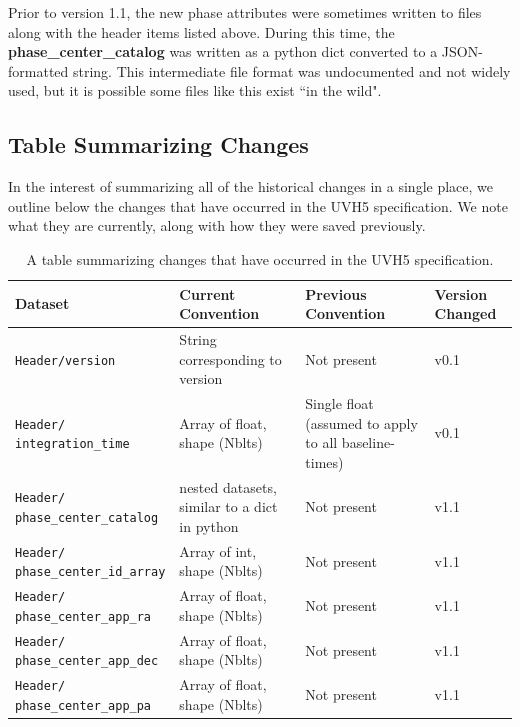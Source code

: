 \documentclass[11pt, oneside]{article}
\begin{document}
Prior to version 1.1, the new phase attributes were sometimes written to files along with the
header items listed above. During this time, the \textbf{phase\_center\_catalog} was written
as a python dict converted to a JSON-formatted string. This intermediate file format was
undocumented and not widely used, but it is possible some files like this exist ``in the wild".

\subsection{Table Summarizing Changes}
\label{sec:version_table}
In the interest of summarizing all of the historical changes in a single place,
we outline below the changes that have occurred in the UVH5 specification. We
note what they are currently, along with how they were saved
previously.

\begin{table}[t]
\begin{center}
  \begin{tabular}{ m{10em} | m{10em} | m{10em} | m{4em} }
    \textbf{Dataset} & \makecell[cl]{\textbf{Current}\\\textbf{Convention}} & \makecell[cl]{\textbf{Previous}\\\textbf{Convention}} & \textbf{Version Changed} \\\hline\hline
    \texttt{Header/version} & String corresponding to version & Not present & v0.1 \\[1em] \hline
    \makecell[tl]{\texttt{Header/}\\\texttt{integration\_time}} & Array of float, shape (Nblts) & Single float (assumed to apply to all baseline-times) & v0.1 \\[1.75em] \hline
    \makecell[tl]{\texttt{Header/}\\\texttt{phase\_center\_catalog}} & nested datasets, similar to a dict in python & Not present & v1.1 \\[1.75em] \hline
    \makecell[tl]{\texttt{Header/}\\\texttt{phase\_center\_id\_array}} & Array of int, shape (Nblts) & Not present & v1.1 \\[1.75em] \hline
    \makecell[tl]{\texttt{Header/}\\\texttt{phase\_center\_app\_ra}} & Array of float, shape (Nblts) & Not present & v1.1 \\[1.75em] \hline
    \makecell[tl]{\texttt{Header/}\\\texttt{phase\_center\_app\_dec}} & Array of float, shape (Nblts) & Not present & v1.1 \\[1.75em] \hline
    \makecell[tl]{\texttt{Header/}\\\texttt{phase\_center\_app\_pa}} & Array of float, shape (Nblts) & Not present & v1.1 \\[1.75em]
  \end{tabular}
\end{center}
  \caption{A table summarizing changes that have occurred in the UVH5 specification.}
  \label{table:history}
\end{table}
\end{document}
